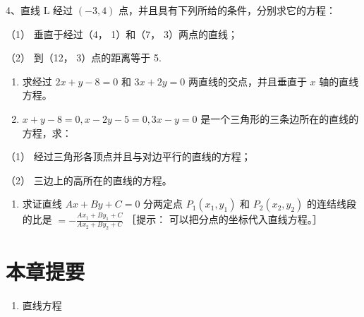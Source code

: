 4、直线 L 经过 \((-3, 4)\) 点，并且具有下列所给的条件，分别求它的方程：

（1） 垂直于经过（4， 1）和（7， 3）两点的直线；

（2） 到（12， 3）点的距离等于 5.

\begin{enumerate}
\def\labelenumi{\arabic{enumi}.}
\setcounter{enumi}{4}
\item
  求经过 \(2x + y - 8 = 0\) 和 \(3x + 2y = 0\) 两直线的交点，并且垂直于
  \(x\) 轴的直线方程。
\item
  \(x + y - 8 = 0, x - 2y - 5 = 0, 3x - y = 0\)
  是一个三角形的三条边所在的直线的方程，求：
\end{enumerate}

（1） 经过三角形各顶点并且与对边平行的直线的方程；

（2） 三边上的高所在的直线的方程。

\begin{enumerate}
\def\labelenumi{\arabic{enumi}.}
\setcounter{enumi}{6}
\tightlist
\item
  求证直线 \(Ax + By + C = 0\) 分两定点 \(P_{1}(x_{1}, y_{1})\) 和
  \(P_{2}(x_{2}, y_{2})\) 的连结线段的比是
  \(= -\frac{Ax_1 + By_1 + C}{Ax_2 + By_2 + C}\) ［提示：
  可以把分点的坐标代入直线方程。］
\end{enumerate}

\section{本章提要}\label{ux672cux7ae0ux63d0ux8981-2}

\begin{enumerate}
\def\labelenumi{\arabic{enumi}.}
\tightlist
\item
  直线方程
\end{enumerate}


